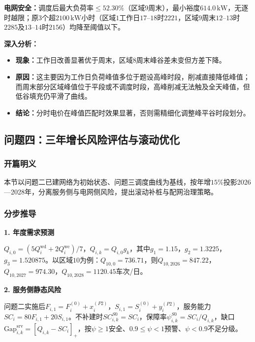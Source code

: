 \documentclass[a4paper,12pt]{ctexart}
\begin{document}

\textbf{电网安全：}调度后最大负荷率$\le52.30\%$（区域$9$周末），最小裕度$614.0\,\mathrm{kW}$，无逐时越限；原$3$个超$2100\,\mathrm{kW}$小时（区域$1$工作日$17\text{--}18$时$2221$，区域$9$周末$12\text{--}13$时$2285$及$13\text{--}14$时$2156$）均降至阈值以下。

\textbf{深入分析：}
\begin{itemize}
\item \textbf{现象：}工作日改善显著优于周末，区域$8$周末峰谷差未变但方差下降。
\item \textbf{原因：}这主要因为工作日负荷峰值多位于题设高峰时段，削减直接降低峰值；而周末部分区域峰值位于平段或不调度时段，高峰削减无法触及全天峰值，但低谷填充仍平滑了曲线。
\item \textbf{结论：}分时电价在峰值匹配时效果显著，否则需精细化调整峰平谷时段划分。
\end{itemize}

\subsection{问题四：三年增长风险评估与滚动优化}

\subsubsection{开篇明义}
本节以问题二已建网络为初始状态、问题三调度曲线为基线，按年增$15\%$投影2026—2028年，分离服务侧与电网侧风险，提出滚动补桩与配网治理策略。

\subsubsection{分步推导}

\textbf{1. 年度需求预测}

$Q_{i,0}=(5Q_{i}^{\mathrm{wd}}+2Q_{i}^{\mathrm{we}})/7$，$Q_{i,k}=Q_{i,0}g_{k}$，其中$g_{1}=1.15$，$g_{2}=1.3225$，$g_{3}=1.520875$。以区域$10$为例：$Q_{10,0}=736.71$，则$Q_{10,2026}=847.22$，$Q_{10,2027}=974.30$，$Q_{10,2028}=1120.45$车次/日。

\textbf{2. 服务侧静态风险}

问题二实施后$F_{i,1}=F_{i}^{(0)}+x_{i}^{(P2)}$，$S_{i,1}=S_{i}^{(0)}+y_{i}^{(P2)}$，服务能力$SC_{i}=80F_{i,1}+20S_{i,1}$。不补建时$SC_{i,k}^{S0}=SC_{i}$，保障率$\psi_{i,k}^{S0}=SC_{i}/Q_{i,k}$，缺口$\mathrm{Gap}_{i,k}^{\mathrm{srv}}=[Q_{i,k}-SC_{i}]_{+}$，按$\psi\ge1$安全、$0.9\le\psi<1$预警、$\psi<0.9$不足分级。
\end{document}
